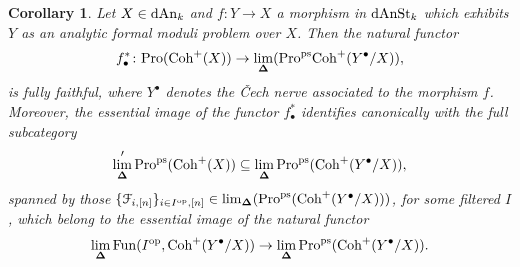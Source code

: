\documentclass[10pt,a4paper,reqno]{amsart} %
\theoremstyle{plain}
\newtheorem{cor}[thm]{Corollary}
\theoremstyle{definition}
\theoremstyle{remark}
\numberwithin{equation}{section}
\begin{document}
\begin{cor} \label{cor:pseudo_nil-descent_for_pro_Coh^+}
    Let $X \in \mathrm{dAn}_k$ and $f \colon Y \to X$ a morphism in $\mathrm{dAnSt}_k$ which exhibits $Y$ as an analytic formal moduli problem over $X$.
    Then the natural functor 
        \[
            f_\bullet^* \colon \mathrm{Pro}(\mathrm{Coh}^+ (X)) \to \lim_{\bm{\Delta}}(\mathrm{Pro}^\mathrm{ps}\mathrm{Coh}^+(Y^\bullet/X)),
        \]
    is fully faithful, where $Y^\bullet$ denotes the \v{C}ech nerve associated to the morphism $f$. Moreover, the essential image of the functor $f_\bullet^*$ identifies canonically with the full subcategory
        \[
            \lim_{\bm{\Delta}}'\mathrm{Pro}^\mathrm{ps}(\mathrm{Coh}^+(X)) \subseteq \lim_{\bm{\Delta}} \mathrm{Pro}^\mathrm{ps}(\mathrm{Coh}^+(Y^\bullet/ X)),
        \]
    spanned by those $\{\mathcal F_{i, [n]} \}_{i \in I^\mathrm{op}, [n]} \in \lim_{\bm{\Delta}}(\mathrm{Pro}^\mathrm{ps}(\mathrm{Coh}^+(Y^\bullet/X)))$, for some filtered \infcat $I$, which belong to the essential image of the natural
    functor
        \[
            \lim_{\bm{\Delta}} \operatorname{Fun}(I^\mathrm{op}, \mathrm{Coh}^+(Y^\bullet/X)) \to \lim_{\bm{\Delta}} \mathrm{Pro}^\mathrm{ps}(\mathrm{Coh}^+(Y^\bullet/X)) . 
        \]
\end{cor}
\end{document}
